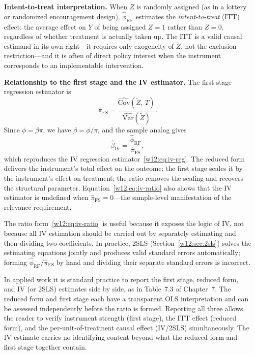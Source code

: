 \documentclass[master.tex]{subfiles}
\begin{document}
\medskip\noindent\textbf{Intent-to-treat interpretation.}
When $Z$ is randomly assigned (as in a lottery or randomized
encouragement design), $\hat\phi_{\mathrm{RF}}$ estimates the
\emph{intent-to-treat} (ITT) effect: the average effect on $Y$ of
being assigned $Z = 1$ rather than $Z = 0$, regardless of whether
treatment is actually taken up.  The ITT is a valid causal estimand
in its own right---it requires only exogeneity of $Z$, not the
exclusion restriction---and it is often of direct policy interest
when the instrument corresponds to an implementable intervention.

\medskip\noindent\textbf{Relationship to the first stage and the IV
estimator.}
The first-stage regression estimator is
\[
  \hat\pi_{\mathrm{FS}}
  = \frac{\widehat{\mathrm{Cov}}(\tilde{Z},\, T)}
         {\widehat{\mathrm{Var}}(\tilde{Z})}.
\]
Since $\phi = \beta\pi$, we have $\beta = \phi/\pi$, and the sample
analog gives
\begin{equation}
  \hat\beta_{\mathrm{IV}}
  = \frac{\hat\phi_{\mathrm{RF}}}{\hat\pi_{\mathrm{FS}}},
  \label{w12:eq:iv-ratio}
\end{equation}
which reproduces the IV regression estimator~\eqref{w12:eq:iv-reg}.
The reduced form delivers the instrument's total effect on the
outcome; the first stage scales it by the instrument's effect on
treatment; the ratio removes the scaling and recovers the structural
parameter.  Equation~\eqref{w12:eq:iv-ratio} also shows that the IV
estimator is undefined when $\hat\pi_{\mathrm{FS}} = 0$---the
sample-level manifestation of the relevance requirement.

The ratio form~\eqref{w12:eq:iv-ratio} is useful because it exposes
the logic of IV, not because all IV estimation should be carried out
by separately estimating and then dividing two coefficients.  In
practice, 2SLS (Section~\ref{w12:sec:2sls}) solves the estimating
equations jointly and produces valid standard errors automatically;
forming $\hat\phi_{\mathrm{RF}}/\hat\pi_{\mathrm{FS}}$ by hand and
dividing their separate standard errors is incorrect.

\begin{remark}
In applied work it is standard practice to report the first stage,
reduced form, and IV (or 2SLS) estimates side by side, as in
Table~7.3 of Chapter~7.  The reduced form and first stage each have
a transparent OLS interpretation and can be assessed independently
before the ratio is formed.  Reporting all three allows the reader
to verify instrument strength (first stage), the ITT effect (reduced
form), and the per-unit-of-treatment causal effect (IV/2SLS)
simultaneously.  The IV estimate carries no identifying content
beyond what the reduced form and first stage together contain.
\end{remark}
\end{document}
